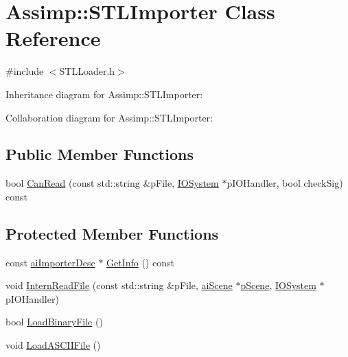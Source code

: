 \hypertarget{class_assimp_1_1_s_t_l_importer}{\section{Assimp\+:\+:S\+T\+L\+Importer Class Reference}
\label{class_assimp_1_1_s_t_l_importer}
}


{\ttfamily \#include $<$S\+T\+L\+Loader.\+h$>$}



Inheritance diagram for Assimp\+:\+:S\+T\+L\+Importer\+:


Collaboration diagram for Assimp\+:\+:S\+T\+L\+Importer\+:
\subsection*{Public Member Functions}
\begin{DoxyCompactItemize}
\item 
bool \hyperlink{class_assimp_1_1_s_t_l_importer_af9ca38d73cba9fac0a56bebf06b3b97f}{Can\+Read} (const std\+::string \&p\+File, \hyperlink{class_assimp_1_1_i_o_system}{I\+O\+System} $\ast$p\+I\+O\+Handler, bool check\+Sig) const 
\end{DoxyCompactItemize}
\subsection*{Protected Member Functions}
\begin{DoxyCompactItemize}
\item 
const \hyperlink{structai_importer_desc}{ai\+Importer\+Desc} $\ast$ \hyperlink{class_assimp_1_1_s_t_l_importer_af8fbcd1f1b57387e615afc737b96aa2a}{Get\+Info} () const 
\item 
void \hyperlink{class_assimp_1_1_s_t_l_importer_a4a1f2e7092290364d9bc52603ed7cf74}{Intern\+Read\+File} (const std\+::string \&p\+File, \hyperlink{structai_scene}{ai\+Scene} $\ast$\hyperlink{class_assimp_1_1_s_t_l_importer_a28bd9586dc31a20f5d56955e82e33b45}{p\+Scene}, \hyperlink{class_assimp_1_1_i_o_system}{I\+O\+System} $\ast$p\+I\+O\+Handler)
\item 
bool \hyperlink{class_assimp_1_1_s_t_l_importer_a55f30d3dae489c087258ebb05a0c7b23}{Load\+Binary\+File} ()
\item 
void \hyperlink{class_assimp_1_1_s_t_l_importer_ae2860c81063d7fea5c4d6b426c7874a6}{Load\+A\+S\+C\+I\+I\+File} ()
\end{DoxyCompactItemize}
